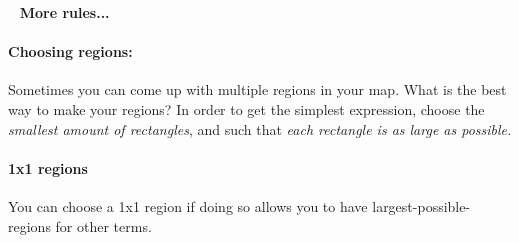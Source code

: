 \documentclass[a4paper,12pt]{book}
\begin{document}
        \begin{intro}{\ }
            \textbf{More rules...}
            
            \paragraph{Choosing regions:}
            Sometimes you can come up with multiple regions in your map.
            What is the best way to make your regions? In order to get
            the simplest expression, choose the \textit{smallest amount of rectangles},
            and such that \textit{each rectangle is as large as possible.}

            \paragraph{1x1 regions} You can choose a 1x1 region if
            doing so allows you to have largest-possible-regions for other terms.
        
        \end{intro}
\end{document}
